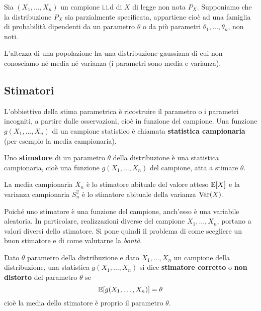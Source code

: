 Sia $(X_1, \dots, X_n)$ un campione i.i.d di $X$ di legge non nota $P_X$. Supponiamo che la
distribuzione $P_X$ sia parzialmente specificata, appartiene cioè ad una famiglia di probabilità
dipendenti da un parametro $\theta$ o da più parametri $\theta_1, \dots, \theta_n$, non noti.

\begin{example}
	L'altezza di una popolazione ha una distribuzione gaussiana di cui non conosciamo né media né
	varianza (i parametri sono media e varianza).
\end{example}

\subsection{Stimatori}\label{def: stimatore}
L'obbiettivo della stima parametrica è ricostruire il parametro o i parametri incogniti, a partire
dalle osservazioni, cioè in funzione del campione. Una funzione $g(X_1, \dots, X_n)$ di un campione
statistico è chiamata \textbf{statistica campionaria} (per esempio la media campionaria).

Uno \textbf{stimatore} di un parametro $\theta$ della distribuzione è una statistica campionaria,
cioè una funzione $g(X_1, \dots, X_n)$ del campione, atta a stimare $\theta$.

\begin{example}
	La media campionaria $\bar{X}_n$ è lo stimatore abituale del valore atteso $\mathbb{E}[X]$ e la
	varianza campionaria $S_n^2$ è lo stimatore abituale della varianza $\operatorname{Var}(X)$.
\end{example}

Poiché uno stimatore è una funzione del campione, anch'esso è una variabile aleatoria. In
particolare, realizzazioni diverse del campione $X_1, \dots, X_n$, portano a valori diversi dello
stimatore. Si pone quindi il problema di come scegliere un buon stimatore e di come valutarne la
\emph{bontà}.

\begin{definition}\label{def: stimatore corretto}
	Dato $\theta$ parametro della distribuzione e dato $X_1, \dots, X_n$ un campione della
	distribuzione, una statistica $g(X_1, \dots, X_n)$ si dice \textbf{stimatore corretto} o
	\textbf{non distorto} del parametro $\theta$ se
	\[ \mathbb{E}[g(X_1, \dots, X_n)] = \theta \]
	cioè la media dello stimatore è proprio il parametro $\theta$.
\end{definition}

